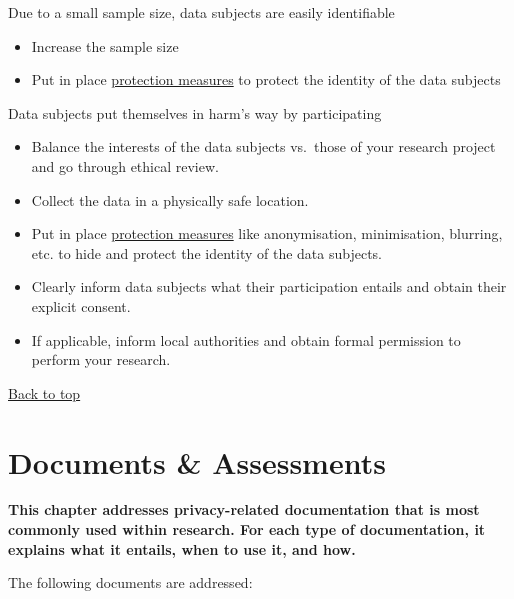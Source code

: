 \documentclass[
]{book}
\providecommand{\tightlist}{%
  \setlength{\itemsep}{0pt}\setlength{\parskip}{0pt}}
\begin{document}
Due to a small sample size, data subjects are easily
identifiable

\begin{itemize}
\tightlist
\item
  Increase the sample size
\item
  Put in place \protect\hyperlink{data-oriented-strategies}{protection measures} to protect
  the identity of the data subjects\\
\end{itemize}

Data subjects put themselves in harm's way by participating

\begin{itemize}
\tightlist
\item
  Balance the interests of the data subjects vs.~those of your research
  project and go through ethical review.
\item
  Collect the data in a physically safe location.
\item
  Put in place \protect\hyperlink{data-oriented-strategies}{protection measures} like
  anonymisation, minimisation, blurring, etc. to hide and protect the identity
  of the data subjects.
\item
  Clearly inform data subjects what their participation entails and obtain
  their explicit consent.
\item
  If applicable, inform local authorities and obtain formal permission to
  perform your research.
\end{itemize}

\protect\hyperlink{example-risks}{Back to top}

\hypertarget{legal-documents}{%
\chapter{Documents \& Assessments}\label{legal-documents}}

\textbf{This chapter addresses privacy-related documentation that is most commonly used
within research. For each type of documentation, it explains what it entails,
when to use it, and how.}

The following documents are addressed:
\end{document}
